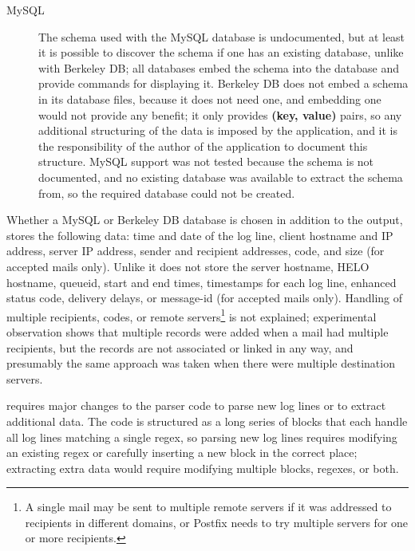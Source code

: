 \begin{description}
    \item [MySQL] The schema used with the MySQL database is undocumented,
        but at least it is possible to discover the schema if one has an
        existing  database, unlike with Berkeley DB\@; all
         databases embed the schema into the database and
        provide commands for displaying it.  Berkeley DB does not embed a
        schema in its database files, because it does not need one, and
        embedding one would not provide any benefit; it only provides
        \textbf{(key, value)} pairs, so any additional structuring of the
        data is imposed by the application, and it is the responsibility of
        the author of the application to document this structure.
         MySQL support was not tested because the schema
        is not documented, and no existing database was available to
        extract the schema from, so the required database could not be
        created.

\end{description}

Whether a MySQL or Berkeley DB database is chosen in addition to the
 output,  stores the following data: time and
date of the log line, client hostname and IP address, server IP address,
sender and recipient addresses,  code, and size (for accepted
mails only).  Unlike \parsername{} it does not store the server hostname,
HELO hostname, queueid, start and end times, timestamps for each log line,
enhanced status code, delivery delays, or message-id (for accepted mails
only).  Handling of multiple recipients,  codes, or remote
servers\footnote{A single mail may be sent to multiple remote servers if it
was addressed to recipients in different domains, or Postfix needs to try
multiple servers for one or more recipients.} is not explained;
experimental observation shows that multiple records were added when a mail
had multiple recipients, but the records are not associated or linked in
any way, and presumably the same approach was taken when there were
multiple destination servers.

 requires major changes to the parser code to parse new log lines
or to extract additional data.  The code is structured as a long series of
blocks that each handle all log lines matching a single regex, so parsing
new log lines requires modifying an existing regex or carefully inserting a
new block in the correct place; extracting extra data would require
modifying multiple blocks, regexes, or both.

